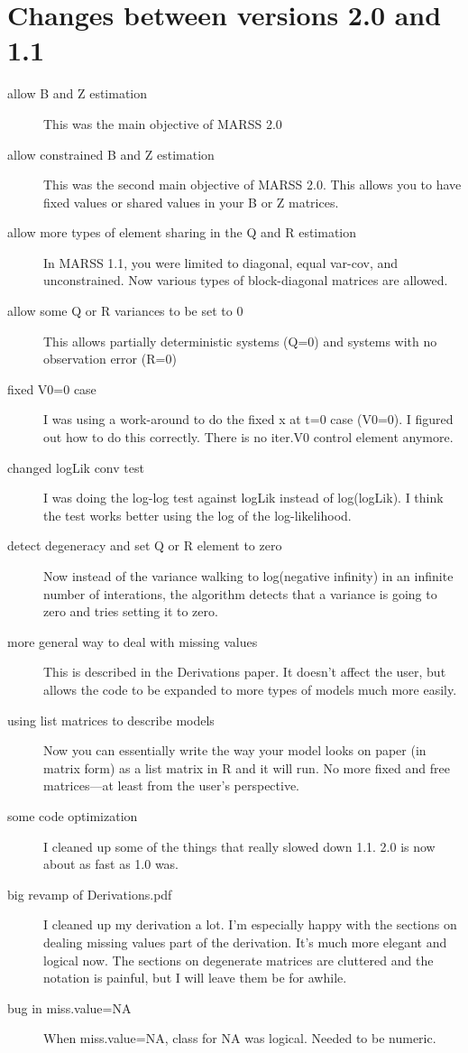 \documentclass[12pt]{article}
\begin{document}
\section{Changes between versions 2.0 and 1.1}
\begin{description}
    \item[allow B and Z estimation] This was the main objective of MARSS 2.0
    \item[allow constrained B and Z estimation] This was the second main objective of MARSS 2.0.  This allows you to have fixed values or shared values in your B or Z matrices.
    \item[allow more types of element sharing in the Q and R estimation] In MARSS 1.1, you were limited to diagonal, equal var-cov, and unconstrained.  Now various types of block-diagonal matrices are allowed.
    \item[allow some Q or R variances to be set to 0] This allows partially deterministic systems (Q=0) and systems with no observation error (R=0)
    \item[fixed V0=0 case] I was using a work-around to do the fixed x at t=0 case (V0=0).  I figured out how to do this correctly.  There is no iter.V0 control element anymore.
    \item[changed logLik conv test] I was doing the log-log test against logLik instead of log(logLik).  I think the test works better using the log of the log-likelihood.
    \item[detect degeneracy and set Q or R element to zero] Now instead of the variance walking to log(negative infinity) in an infinite number of interations, the algorithm detects that a variance is going to zero and tries setting it to zero.
    \item[more general way to deal with missing values] This is described in the Derivations paper.  It doesn't affect the user, but allows the code to be expanded to more types of models much more easily.
    \item[using list matrices to describe models] Now you can essentially write the way your model looks on paper (in matrix form) as a list matrix in R and it will run.  No more fixed and free matrices---at least from the user's perspective.
    \item[some code optimization] I cleaned up some of the things that really slowed down 1.1.  2.0 is now about as fast as 1.0 was.
    \item[big revamp of Derivations.pdf] I cleaned up my derivation a lot.  I'm especially happy with the sections on dealing missing values part of the derivation.  It's much more elegant and logical now.  The sections on degenerate matrices are cluttered and the notation is painful, but I will leave them be for awhile.
    \item[bug in miss.value=NA] When miss.value=NA, class for NA was logical.  Needed to be numeric.
\end{description}
\end{document}
